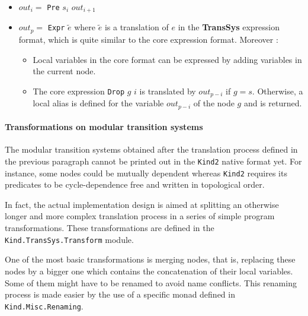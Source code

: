 \begin{itemize}
\item $out_{i} = $  \texttt{Pre} $s_i$  $out_{i + 1}$
\item $out_{p} = $  \texttt{Expr} $\tilde e$  where $\tilde e$ is a translation of $e$ in the \textbf{TransSys} expression format, which is quite similar to the core expression format. Moreover :

\begin{itemize}
\item Local variables in the core format can be expressed by adding variables in the current node.
\item The core expression \texttt{Drop} $g$ $i$ is translated by $out_{p - i}$ if $g = s$. Otherwise, a local alias is defined for the variable $out_{p - i}$ of the node $g$ and is returned.
\end{itemize}

\end{itemize}

\paragraph{Transformations on modular transition systems} 

The modular transition systems obtained after the translation process
defined in the previous paragraph cannot  be printed out in the \texttt{Kind2} native format yet. For instance, some nodes could be mutually dependent whereas \texttt{Kind2} requires its predicates to be cycle-dependence free and written in topological order.


In fact, the actual implementation design is aimed at splitting an otherwise longer and more complex translation process in a series of simple program transformations. These transformations are defined in the \texttt{Kind.TransSys.Transform} module.

\bigskip

One of the most basic transformations is merging  nodes, that is, replacing these nodes by a bigger one which contains the concatenation of their local variables. Some of them might have to be renamed to avoid name conflicts. This renaming process is made easier by the use of a specific monad defined in \texttt{Kind.Misc.Renaming}.

